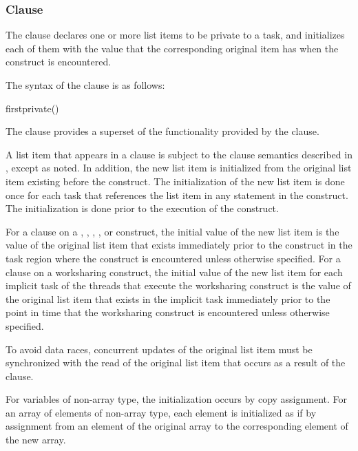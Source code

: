 \subsubsection{ Clause}
\label{subsubsec:firstprivate clause}
\summary
The  clause declares one or more list items to be private 
to a task, and initializes each of them with the value that the corresponding 
original item has when the construct is encountered.

\syntax
The syntax of the  clause is as follows:

\begin{ompSyntax}
firstprivate()
\end{ompSyntax}

\descr
The  clause provides a superset of the functionality provided 
by the  clause.

A list item that appears in a  clause is subject to the 
 clause semantics described in ,
except as noted. In addition, the new list item is initialized from the original 
list item existing before the construct. The initialization of the new list item 
is done once for each task that references the list item in any statement in the 
construct. The initialization is done prior to the execution of the construct.

For a  clause on a , ,
, , or  construct, the initial
value of the new list item is the value of the original list item that
exists immediately prior to the construct in the task region where the
construct is encountered unless otherwise specified. For a
 clause on a worksharing construct, the initial
value of the new list item for each implicit task of the threads that
execute the worksharing construct is the value of the original list
item that exists in the implicit task immediately prior to the point
in time that the worksharing construct is encountered unless otherwise
specified.

To avoid data races, concurrent updates of the original list item must be
synchronized with the read of the original list item that occurs as a result of the
 clause.

\begin{ccppspecific}
For variables of non-array type, the initialization occurs by copy assignment. 
For an array of elements of non-array type, each element is initialized as if 
by assignment from an element of the original array to the corresponding element 
of the new array. 
\end{ccppspecific}


